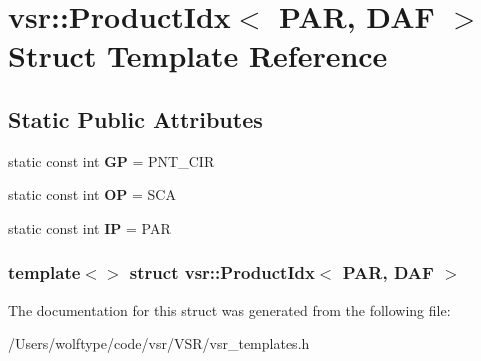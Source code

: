 \hypertarget{structvsr_1_1_product_idx_3_01_p_a_r_00_01_d_a_f_01_4}{\section{vsr\-:\-:Product\-Idx$<$ P\-A\-R, D\-A\-F $>$ Struct Template Reference}
\label{structvsr_1_1_product_idx_3_01_p_a_r_00_01_d_a_f_01_4}
}
\subsection*{Static Public Attributes}
\begin{DoxyCompactItemize}
\item 
\hypertarget{structvsr_1_1_product_idx_3_01_p_a_r_00_01_d_a_f_01_4_a0578d38fa39396e6ad7789dd653d2e47}{static const int {\bfseries G\-P} = P\-N\-T\-\_\-\-C\-I\-R}\label{structvsr_1_1_product_idx_3_01_p_a_r_00_01_d_a_f_01_4_a0578d38fa39396e6ad7789dd653d2e47}

\item 
\hypertarget{structvsr_1_1_product_idx_3_01_p_a_r_00_01_d_a_f_01_4_a5bee93f35927748181c95a6705b1a111}{static const int {\bfseries O\-P} = S\-C\-A}\label{structvsr_1_1_product_idx_3_01_p_a_r_00_01_d_a_f_01_4_a5bee93f35927748181c95a6705b1a111}

\item 
\hypertarget{structvsr_1_1_product_idx_3_01_p_a_r_00_01_d_a_f_01_4_ae51dd470385e9e33d8480ce206df4e10}{static const int {\bfseries I\-P} = P\-A\-R}\label{structvsr_1_1_product_idx_3_01_p_a_r_00_01_d_a_f_01_4_ae51dd470385e9e33d8480ce206df4e10}

\end{DoxyCompactItemize}
\subsubsection*{template$<$$>$ struct vsr\-::\-Product\-Idx$<$ P\-A\-R, D\-A\-F $>$}



The documentation for this struct was generated from the following file\-:\begin{DoxyCompactItemize}
\item 
/\-Users/wolftype/code/vsr/\-V\-S\-R/vsr\-\_\-templates.\-h\end{DoxyCompactItemize}
